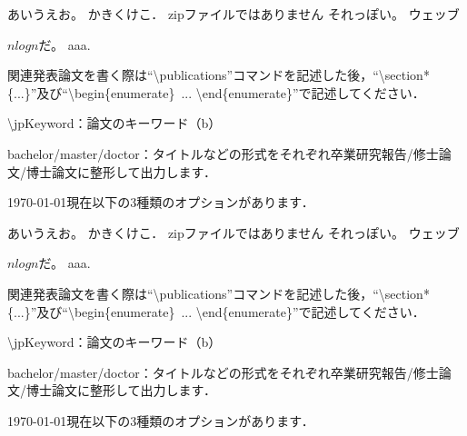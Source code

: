 
あいうえお。
かきくけこ．
zipファイルではありません
それっぽい。
ウェッブ

$n log n$だ。
aaa.\cite{bbb:123}

関連発表論文を書く際は``\textbackslash publications''コマンドを記述した後，``\textbackslash section*\{...\}''及び``\textbackslash begin\{enumerate\}\ ... \textbackslash end\{enumerate\}''で記述してください．

\item \textbackslash jpKeyword：論文のキーワード（b）

\item bachelor/master/doctor：タイトルなどの形式をそれぞれ卒業研究報告/修士論文/博士論文に整形して出力します．

\today 現在以下の3種類のオプションがあります．


あいうえお。
かきくけこ．
zipファイルではありません
それっぽい。
ウェッブ

$n log n$だ。
aaa.\cite{bbb:123}

関連発表論文を書く際は``\textbackslash publications''コマンドを記述した後，``\textbackslash section*\{...\}''及び``\textbackslash begin\{enumerate\}\ ... \textbackslash end\{enumerate\}''で記述してください．

\item \textbackslash jpKeyword：論文のキーワード（b）

\item bachelor/master/doctor：タイトルなどの形式をそれぞれ卒業研究報告/修士論文/博士論文に整形して出力します．

\today 現在以下の3種類のオプションがあります．
